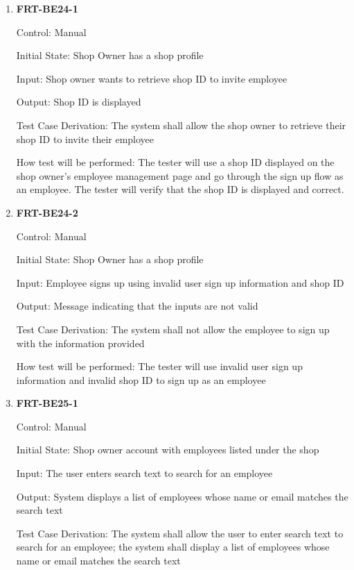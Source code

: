 \documentclass[12pt, titlepage]{article}
\begin{document}
\begin{enumerate}

	\item \textbf{FRT-BE24-1}

	      Control: Manual

	      Initial State: Shop Owner has a shop profile

	      Input: Shop owner wants to retrieve shop ID to invite employee

	      Output: Shop ID is displayed

	      Test Case Derivation: The system shall allow the shop owner to retrieve their shop ID to invite
	      their employee

	      How test will be performed: The tester will use a shop ID displayed on the shop owner's employee
	      management page and go through the sign up flow as an employee. The tester will verify that the
	      shop ID is displayed and correct.

	\item \textbf{FRT-BE24-2}

	      Control: Manual

	      Initial State: Shop Owner has a shop profile

	      Input: Employee signs up using invalid user sign up information and shop ID

	      Output: Message indicating that the inputs are not valid

	      Test Case Derivation: The system shall not allow the employee to sign up with the information
	      provided

	      How test will be performed: The tester will use invalid user sign up information and invalid shop
	      ID to sign up as an employee

	\item \textbf{FRT-BE25-1}

	      Control: Manual

	      Initial State: Shop owner account with employees listed under the shop

	      Input: The user enters search text to search for an employee

	      Output: System displays a list of employees whose name or email matches the search text

	      Test Case Derivation: The system shall allow the user to enter search text to search for an
	      employee; the system shall display a list of employees whose name or email matches the search text


\end{enumerate}
\end{document}
